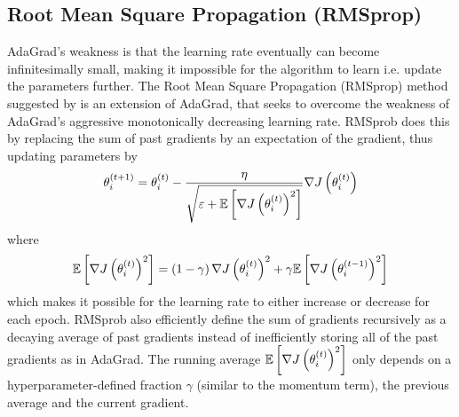 \subsection{Root Mean Square Propagation (RMSprop)}
AdaGrad's weakness is that the learning rate eventually can become infinitesimally small, making it impossible for the algorithm to learn i.e. update the parameters further. The Root Mean Square Propagation (RMSprop) method suggested by \cite{Tieleman_Hinton2012} is an extension of AdaGrad, that seeks to overcome the weakness of AdaGrad's aggressive monotonically decreasing learning rate. RMSprob does this by replacing the sum of past gradients by an expectation of the gradient, thus updating parameters by
\begin{equation*}
    \theta^{(t+1)}_i = \theta^{(t)}_i - \frac{\eta}{\sqrt{\varepsilon + \E \lrs{\nabla J \lr{\theta_i^{(t)}}^2}}} \nabla J \lr{\theta_i^{(t)}}
\end{equation*}
where 
\begin{equation*}
    \E \lrs{\nabla J \lr{\theta_i^{(t)}}^2} = \lr{1 - \gamma}\nabla J \lr{\theta_i^{(t)}}^2 + \gamma \E \lrs{\nabla J \lr{\theta_i^{(t-1)}}^2}
\end{equation*}
which makes it possible for the learning rate to either increase or decrease for each epoch. RMSprob also efficiently define the sum of gradients recursively as a decaying average of past gradients instead of inefficiently storing all of the past gradients as in AdaGrad. The running average $\E \lrs{\nabla J \lr{\theta_i^{(t)}}^2}$ only depends on a hyperparameter-defined fraction $\gamma$ (similar to the momentum term), the previous average and the current gradient.


